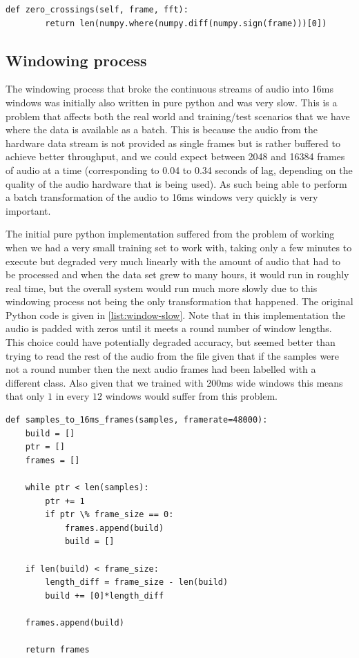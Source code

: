 \documentclass[ %
                    author={Sam Phippen},
                supervisor={Dr. Rafal Bogacz},
                     title={Real time voice activity detectors in noisy personal computing environments},
                  subtitle={},
                    degree={MEng},
                      year={2012} ]{thesis}
\begin{document}
\begin{lstlisting}[frame=single,caption=Numpy fast zero crossing rate implementation, label=list:zcr-fast]
    def zero_crossings(self, frame, fft):
        return len(numpy.where(numpy.diff(numpy.sign(frame)))[0])
\end{lstlisting}

\subsection{Windowing process}

The windowing process that broke the continuous streams of audio into 16ms
windows was initially also written in pure python and was very slow. This is a
problem that affects both the real world and training/test scenarios that we
have where the data is available as a batch. This is because the audio from the
hardware data stream is not provided as single frames but is rather buffered
to achieve better throughput, and we could expect between 2048 and 16384 frames
of audio at a time (corresponding to 0.04 to 0.34 seconds of lag, depending on
the quality of the audio hardware that is being used). As such being able to
perform a batch transformation of the audio to 16ms windows very quickly is very
important.

The initial pure python implementation suffered from the problem of working
when we had a very small training set to work with, taking only a few minutes
to execute but degraded very much linearly with the amount of audio that had to
be processed and when the data set grew to many hours, it would run in roughly
real time, but the overall system would run much more slowly due to this
windowing process not being the only transformation that happened. The original
Python code is given in \ref{list:window-slow}. Note that in this
implementation the audio is padded with zeros until it meets a round number of
window lengths. This choice could have potentially degraded accuracy, but
seemed better than trying to read the rest of the audio from the file given
that if the samples were not a round number then the next audio frames had been
labelled with a different class. Also given that we trained with 200ms wide
windows this means that only $1$ in every $12$ windows would suffer from this
problem.


\begin{lstlisting}[frame=single,caption=Original slow windowing implementation, label=list:windowing-slow]
def samples_to_16ms_frames(samples, framerate=48000):
    build = []
    ptr = []
    frames = []

    while ptr < len(samples):
        ptr += 1
        if ptr \% frame_size == 0:
            frames.append(build)
            build = []

    if len(build) < frame_size:
        length_diff = frame_size - len(build)
        build += [0]*length_diff

    frames.append(build)

    return frames

\end{lstlisting}
\end{document}
